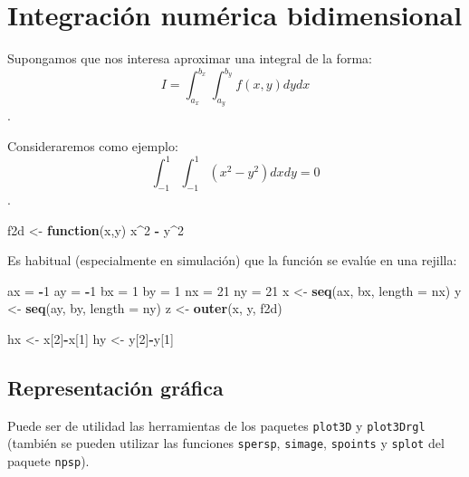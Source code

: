 \documentclass[]{book}
\newenvironment{Shaded}{\begin{snugshade}}{\end{snugshade}}
\newcommand{\KeywordTok}[1]{\textcolor[rgb]{0.13,0.29,0.53}{\textbf{#1}}}
\newcommand{\DataTypeTok}[1]{\textcolor[rgb]{0.13,0.29,0.53}{#1}}
\newcommand{\DecValTok}[1]{\textcolor[rgb]{0.00,0.00,0.81}{#1}}
\newcommand{\StringTok}[1]{\textcolor[rgb]{0.31,0.60,0.02}{#1}}
\newcommand{\ControlFlowTok}[1]{\textcolor[rgb]{0.13,0.29,0.53}{\textbf{#1}}}
\newcommand{\OperatorTok}[1]{\textcolor[rgb]{0.81,0.36,0.00}{\textbf{#1}}}
\newcommand{\NormalTok}[1]{#1}
\theoremstyle{definition}
\theoremstyle{definition}
\theoremstyle{definition}
\theoremstyle{remark}
\begin{document}
\section{Integración numérica
bidimensional}\label{integracion-numerica-bidimensional}

Supongamos que nos interesa aproximar una integral de la forma:
\[I=\int_{a_x}^{b_x}\int_{a_y}^{b_y}f(x, y)dy dx\].

Consideraremos como ejemplo:
\[\int_{-1}^{1} \int_{-1}^{1} \left( x^2 - y^2 \right) dx dy = 0\].

\begin{Shaded}
\begin{Highlighting}[]
\NormalTok{f2d <-}\StringTok{ }\ControlFlowTok{function}\NormalTok{(x,y) x}\OperatorTok{^}\DecValTok{2} \OperatorTok{-}\StringTok{ }\NormalTok{y}\OperatorTok{^}\DecValTok{2}
\end{Highlighting}
\end{Shaded}

Es habitual (especialmente en simulación) que la función se evalúe en
una rejilla:

\begin{Shaded}
\begin{Highlighting}[]
\NormalTok{ax =}\StringTok{ }\OperatorTok{-}\DecValTok{1}
\NormalTok{ay =}\StringTok{ }\OperatorTok{-}\DecValTok{1}
\NormalTok{bx =}\StringTok{ }\DecValTok{1}
\NormalTok{by =}\StringTok{ }\DecValTok{1}
\NormalTok{nx =}\StringTok{ }\DecValTok{21}
\NormalTok{ny =}\StringTok{ }\DecValTok{21}
\NormalTok{x <-}\StringTok{ }\KeywordTok{seq}\NormalTok{(ax, bx, }\DataTypeTok{length =}\NormalTok{ nx)}
\NormalTok{y <-}\StringTok{ }\KeywordTok{seq}\NormalTok{(ay, by, }\DataTypeTok{length =}\NormalTok{ ny)}
\NormalTok{z <-}\StringTok{ }\KeywordTok{outer}\NormalTok{(x, y, f2d)}

\NormalTok{hx <-}\StringTok{ }\NormalTok{x[}\DecValTok{2}\NormalTok{]}\OperatorTok{-}\NormalTok{x[}\DecValTok{1}\NormalTok{]}
\NormalTok{hy <-}\StringTok{ }\NormalTok{y[}\DecValTok{2}\NormalTok{]}\OperatorTok{-}\NormalTok{y[}\DecValTok{1}\NormalTok{]}
\end{Highlighting}
\end{Shaded}

\subsection{Representación gráfica}\label{representacion-grafica}

Puede ser de utilidad las herramientas de los paquetes \texttt{plot3D} y
\texttt{plot3Drgl} (también se pueden utilizar las funciones
\texttt{spersp}, \texttt{simage}, \texttt{spoints} y \texttt{splot} del
paquete \texttt{npsp}).
\end{document}
